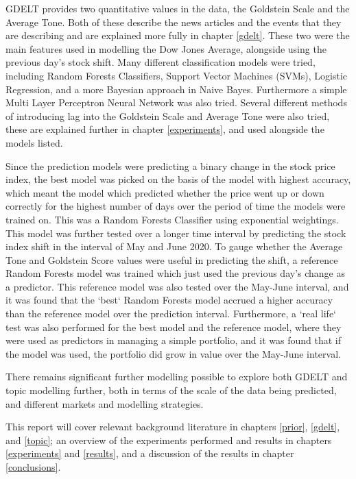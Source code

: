 GDELT provides two quantitative values in the data, the Goldstein Scale and the Average Tone. Both of these describe the news articles and the events that they are describing and are explained more fully in chapter \ref{gdelt}. These two were the main features used in modelling the Dow Jones Average, alongside using the previous day's stock shift. Many different classification models were tried, including Random Forests Classifiers, Support Vector Machines (SVMs), Logistic Regression, and a more Bayesian approach in Naive Bayes. Furthermore a simple Multi Layer Perceptron Neural Network was also tried. Several different methods of introducing lag into the Goldstein Scale and Average Tone were also tried, these are explained further in chapter \ref{experiments}, and used alongside the models listed. 

Since the prediction models were predicting a binary change in the stock price index, the best model was picked on the basis of the model with highest accuracy, which meant the model which predicted whether the price went up or down correctly for the highest number of days over the period of time the models were trained on. This was a Random Forests Classifier using exponential weightings. This model was further tested over a longer time interval by predicting the stock index shift in the interval of May and June 2020. To gauge whether the Average Tone and Goldstein Score values were useful in predicting the shift, a reference Random Forests model was trained which just used the previous day's change as a predictor. This reference model was also tested over the May-June interval, and it was found that the `best` Random Forests model accrued a higher accuracy than the reference model over the prediction interval. Furthermore, a `real life` test was also performed for the best model and the reference model, where they were used as predictors in managing a simple portfolio, and it was found that if the model was used, the portfolio did grow in value over the May-June interval.  

There remains significant further modelling possible to explore both GDELT and topic modelling further, both in terms of the scale of the data being predicted, and different markets and modelling strategies. 

This report will cover relevant background literature in chapters \ref{prior}, \ref{gdelt}, and \ref{topic};  an overview of the experiments performed and results in chapters \ref{experiments} and \ref{results}, and a discussion of the results in chapter \ref{conclusions}.